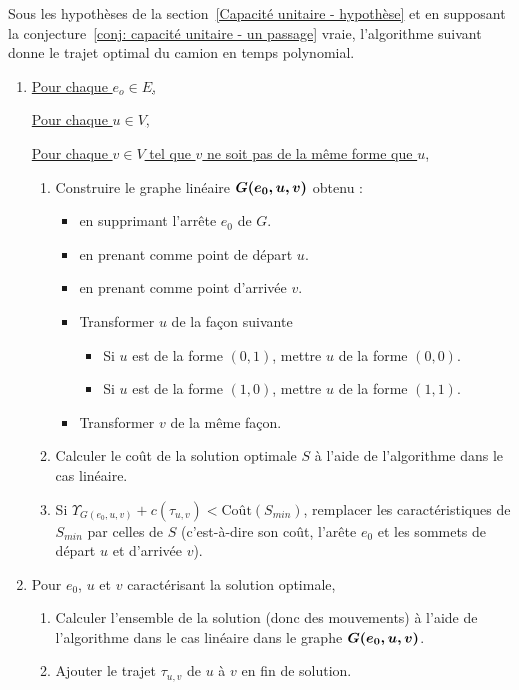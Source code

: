 \begin{thm} \label{thm: capacité unitaire - optimalité}
Sous les hypothèses de la section~\ref{Capacité unitaire - hypothèse} et en supposant la conjecture~\ref{conj: capacité unitaire - un passage} vraie, l'algorithme suivant donne le trajet optimal du camion en temps polynomial.
\end{thm}
\begin{enumerate}
\item \uline{Pour chaque $e_o \in E$,}

  \uline{Pour chaque $u \in V$,}

  \uline{Pour chaque $v \in V$ tel que $v$ ne soit pas de la même forme que $u$},
  \begin{enumerate}
  \item Construire le graphe linéaire $\boldsymbol{G(e_0,u,v)}$ obtenu :
    \begin{itemize}
    \item en supprimant l'arrête $e_0$ de $G$.
    \item en prenant comme point de départ $u$.
    \item en prenant comme point d'arrivée $v$.
    \item Transformer $u$ de la façon suivante
      \begin{itemize}
        \item Si $u$ est de la forme $(0,1)$, mettre $u$ de la forme $(0,0)$.
        \item Si $u$ est de la forme $(1,0)$, mettre $u$ de la forme $(1,1)$.
      \end{itemize}
    \item Transformer $v$ de la même façon.
    \end{itemize}
  \item Calculer le coût de la solution optimale $S$ à l'aide de l'algorithme dans le cas linéaire.
  \item Si $\Upsilon_{G(e_0,u,v)} + c(\tau_{u,v}) < \mbox{Coût}(S_{min})$, remplacer les caractéristiques de $S_{min}$ par celles de $S$ (c'est-à-dire son coût, l'arête $e_0$ et les sommets de départ $u$ et d'arrivée $v$).
  \end{enumerate}
\item Pour $e_0$, $u$ et $v$ caractérisant la solution optimale,
  \begin{enumerate}
  \item Calculer l'ensemble de la solution (donc des mouvements) à l'aide de l'algorithme dans le cas linéaire dans le graphe $\boldsymbol{G(e_0,u,v)}$.
  \item Ajouter le trajet $\tau_{u,v}$ de $u$ à $v$ en fin de solution.

\end{enumerate}
\end{enumerate}
